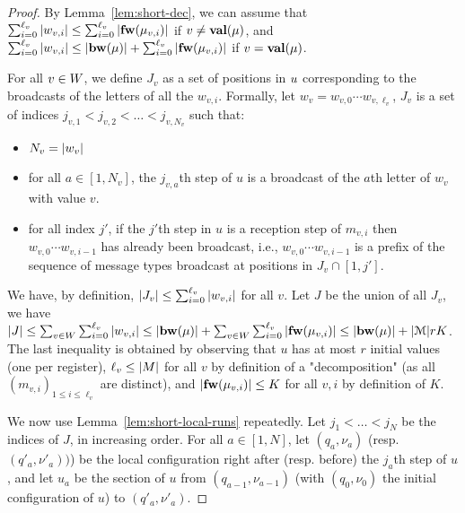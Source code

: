 \begin{proof}
	By Lemma~\ref{lem:short-dec}, we can assume that $\sum_{i=0}^{\ell_v} |w_{v,i}| \leq \sum_{i=0}^{\ell_v} |\mathbf{fw}(\mu_{v,i})|$ if $v \neq \mathbf{val}(\mu)$, and $\sum_{i=0}^{\ell_v} |w_{v,i}| \leq |\mathbf{bw}(\mu)| + \sum_{i=0}^{\ell_v} |\mathbf{fw}(\mu_{v,i})|$ if $v = \mathbf{val}(\mu)$.
	
	For all $v\in W$, we define $J_v$ as a set of positions in $u$ corresponding to the broadcasts of the letters of all the $w_{v,i}$. Formally, let $w_v = w_{v,0} \cdots w_{v,\ell_v}$, $J_v$ is a set of indices $j_{v,1} < j_{v,2} < \ldots < j_{v,N_v}$ such that: 
	\begin{itemize}
		\item $N_v = |w_v|$
		
		\item for all $a \in [1,N_v]$, the $j_{v,a}$th step of $u$ is a broadcast of the $a$th letter of $w_v$ with value $v$.
		
		\item for all index $j'$, if the $j'$th step in $u$ is a reception step of $m_{v, i}$ then $w_{v,0} \cdots w_{v,i-1}$ has already been broadcast, i.e., $w_{v,0} \cdots w_{v,i-1}$ is a prefix of the sequence of message types broadcast at positions in $J_v \cap [1, j']$.
	\end{itemize}

	We have, by definition, $|J_v| \leq \sum_{i=0}^{\ell_v} |w_{v,i}|$ for all $v$.
	Let $J$ be the union of all $J_v$, we have $|J| \leq \sum_{v \in W}\sum_{i=0}^{\ell_v} |w_{v,i}| \leq |\mathbf{bw}(\mu)| +  \sum_{v \in W}\sum_{i=0}^{\ell_v} |\mathbf{fw}(\mu_{v,i})|  \leq |\mathbf{bw}(\mu)|+ |\mathcal{M}|rK$. The last inequality is obtained by observing that $u$ has at most $r$ initial values (one per register), $\ell_v \leq |M|$ for all $v$ by definition of a "decomposition" (as all $(m_{v,i})_{1\leq i \leq \ell_v}$ are distinct), and $|\mathbf{fw}(\mu_{v,i})| \leq K$ for all $v,i$ by definition of $K$.
	
	We now use Lemma~\ref{lem:short-local-runs} repeatedly. Let $j_1< \ldots < j_N$ be the indices of $J$, in increasing order. For all $a \in [1,N]$, let $(q_a, \nu_a)$ (resp. $(q'_a, \nu'_a))$) be the local configuration right after (resp. before) the $j_a$th step of $u$, and let $u_a$ be the section of $u$ from $(q_{a-1}, \nu_{a-1})$ (with $(q_0, \nu_0)$ the initial configuration of $u$) to $(q'_a, \nu'_a)$.
	

\end{proof}
